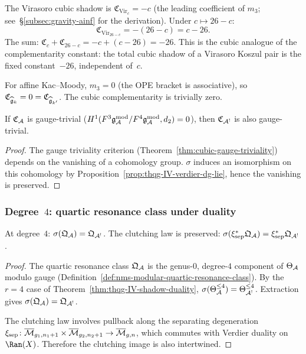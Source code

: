 \begin{computation}
\label{comp:thqg-IV-cubic-virasoro}
The Virasoro cubic shadow is $\mathfrak{C}_{\mathrm{Vir}_c} = -c$
(the leading coefficient of $m_3$;
see~\S\ref{subsec:gravity-ainf} for the derivation).
Under $c \mapsto 26 - c$:
\[
\mathfrak{C}_{\mathrm{Vir}_{26-c}} = -(26 - c) = c - 26.
\]
The sum: $\mathfrak{C}_c + \mathfrak{C}_{26-c} = -c + (c - 26) = -26$.
This is the cubic analogue of the complementarity constant: the total
cubic shadow of a Virasoro Koszul pair is the fixed constant~$-26$,
independent of~$c$.

For affine Kac--Moody, $m_3 = 0$ (the OPE bracket is associative),
so $\mathfrak{C}_{\widehat{\mathfrak{g}}_k} = 0 = \mathfrak{C}_{\widehat{\mathfrak{g}}_{k'}}$.
The cubic complementarity is trivially zero.
\end{computation}

\begin{corollary}
\label{cor:thqg-IV-cubic-gauge-duality}
If $\mathfrak{C}_{\mathcal{A}}$ is gauge-trivial
\textup{(}$H^1(F^3\mathfrak{g}_{\mathcal{A}}^{\mathrm{mod}}/F^4\mathfrak{g}_{\mathcal{A}}^{\mathrm{mod}}, d_2) = 0$\textup{)},
then $\mathfrak{C}_{\mathcal{A}^!}$ is also gauge-trivial.
\end{corollary}

\begin{proof}
The gauge triviality criterion
(Theorem~\ref{thm:cubic-gauge-triviality})
depends on the vanishing of a cohomology group.
$\sigma$ induces an isomorphism on this cohomology by
Proposition~\ref{prop:thqg-IV-verdier-dg-lie}, hence the vanishing
is preserved.
\end{proof}

\subsubsection{Degree~$4$: quartic resonance class under duality}

\begin{proposition}
\label{prop:thqg-IV-quartic-duality}
At degree~$4$:
$\sigma(\mathfrak{Q}_{\mathcal{A}}) = \mathfrak{Q}_{\mathcal{A}^!}$.
The clutching law is preserved:
$\sigma(\xi^*_{\mathrm{sep}}\mathfrak{Q}_{\mathcal{A}})
= \xi^*_{\mathrm{sep}}\mathfrak{Q}_{\mathcal{A}^!}$.
\end{proposition}

\begin{proof}
The quartic resonance class $\mathfrak{Q}_{\mathcal{A}}$ is the genus-$0$,
degree-$4$ component of $\Theta_{\mathcal{A}}$ modulo gauge
(Definition~\ref{def:nms-modular-quartic-resonance-class}). By the $r = 4$
case of Theorem~\ref{thm:thqg-IV-shadow-duality},
$\sigma(\Theta_{\mathcal{A}}^{\leq 4}) = \Theta_{\mathcal{A}^!}^{\leq 4}$.
Extraction gives $\sigma(\mathfrak{Q}_{\mathcal{A}}) = \mathfrak{Q}_{\mathcal{A}^!}$.

The clutching law involves pullback along the separating degeneration
$\xi_{\mathrm{sep}}\colon
\overline{\mathcal{M}}_{g_1,n_1+1} \times \overline{\mathcal{M}}_{g_2,n_2+1}
\to \overline{\mathcal{M}}_{g,n}$, which commutes with Verdier duality
on $\Ran(X)$. Therefore the clutching image is also intertwined.
\end{proof}


